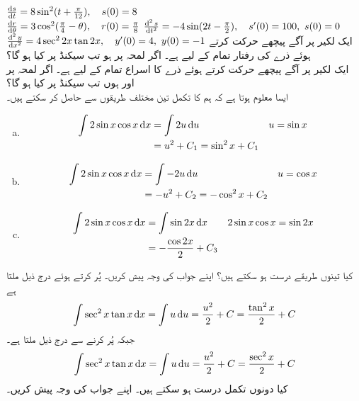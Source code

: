$\tfrac{\dif s}{\dif t}=8\sin^2(t+\tfrac{\pi}{12}),\quad s(0)=8$\\
$\tfrac{\dif r}{\dif \theta}=3\cos^2(\tfrac{\pi}{4}-\theta),\quad r(0)=\tfrac{\pi}{8}$
$\tfrac{\dif^{\,2}s}{\dif t^2}=-4\sin(2t-\tfrac{\pi}{2}),\quad s'(0)=100,\,\, s(0)=0$\\
$\tfrac{\dif^{\,2} y}{\dif x^2}=4\sec^22x\tan 2x,\quad y'(0)=4,\,\,y(0)=-1$
ایک لکیر پر آگے پیچھے حرکت کرتے ہوئے ذرے کی رفتار تمام  کے لیے 
 ہے۔ اگر لمحہ  پر  ہو تب
  سیکنڈ  پر  کیا ہو گا؟\\
ایک لکیر پر آگے پیچھے حرکت کرتے ہوئے ذرے کا اسراع تمام  کے لیے  ہے۔ اگر لمحہ  پر  اور  ہوں تب  سیکنڈ  پر  کیا ہو گا؟
\\
ایسا معلوم ہوتا ہے کہ ہم  کا تکمل تین مختلف طریقوں سے حاصل کر سکتے ہیں۔
\begin{enumerate}[a.]
\item
\begin{align*}
\int 2\sin x\cos x\dif x&=\int 2u\dif u&&u=\sin x\\
&=u^2+C_1=\sin^2x+C_1
\end{align*}
\item
\begin{align*}
\int 2\sin x\cos x\dif x&=\int -2u\dif u&&u=\cos x\\
&=-u^2+C_2=-\cos^2x+C_2
\end{align*}
\item
\begin{align*}
\int 2\sin x\cos x\dif x&=\int \sin 2x\dif x&&2\sin x\cos x=\sin 2x\\
&=-\frac{\cos 2x}{2}+C_3
\end{align*}
\end{enumerate}
کیا تینوں طریقے درست ہو سکتے ہیں؟ اپنے جواب کی وجہ پیش کریں۔ 
 پُر کرتے ہوئے درج ذیل ملتا ہے
\begin{align*}
\int \sec^2x\tan x\dif x=\int u\dif u=\frac{u^2}{2}+C=\frac{\tan^2 x}{2}+C
\end{align*}
جبکہ  پُر کرنے سے درج ذیل ملتا ہے۔
\begin{align*}
\int \sec^2x\tan x\dif x=\int u\dif u=\frac{u^2}{2}+C=\frac{\sec^2x}{2}+C
\end{align*}
کیا دونوں تکمل درست ہو سکتے ہیں۔ اپنے جواب کی وجہ پیش کریں۔

